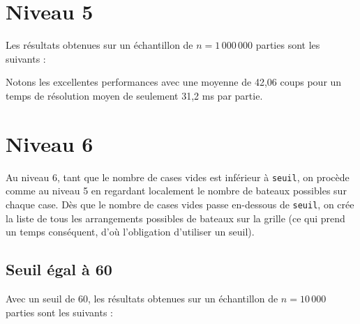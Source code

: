 \newpage
\section{Niveau 5}
Les résultats obtenues sur un échantillon de $n=1\,000\,000$ parties sont les suivants :

\begin{center}
\end{center}

Notons les excellentes performances avec une moyenne de 42,06 coups pour un temps de résolution moyen de seulement 31,2 ms par partie. 

\newpage
\section{Niveau 6}
Au niveau 6, tant que le nombre de cases vides est inférieur à \texttt{seuil}, on procède comme au niveau 5 en regardant localement le nombre de bateaux possibles sur chaque case. Dès que le nombre de cases vides passe en-dessous de \texttt{seuil}, on crée la liste de tous les arrangements possibles de bateaux sur la grille (ce qui prend un temps conséquent, d'où l'obligation d'utiliser un seuil).
\subsection{Seuil égal à 60}
Avec un seuil de 60, les résultats obtenues sur un échantillon de $n=10\,000$ parties sont les suivants :

